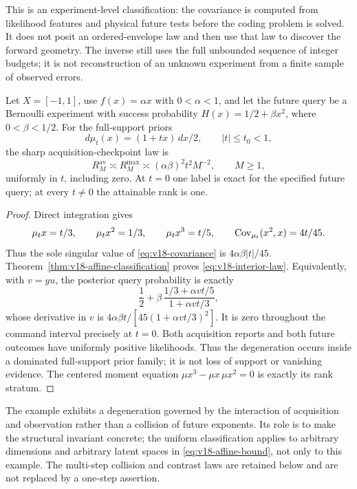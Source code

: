 This is an experiment-level classification: the covariance is computed
from likelihood features and physical future tests before the coding
problem is solved. It does not posit an ordered-envelope law and then
use that law to discover the forward geometry. The inverse still uses
the full unbounded sequence of integer budgets; it is not reconstruction
of an unknown experiment from a finite sample of observed errors.

\begin{proposition}
\label{prop:v18-interior-example}
Let $X=[-1,1]$, use $f(x)=\alpha x$ with $0<\alpha<1$, and let the
future query be a Bernoulli experiment with success probability
$H(x)=1/2+\beta x^2$, where $0<\beta<1/2$. For the full-support priors
\[
 d\mu_t(x)=(1+tx)\,dx/2,\qquad |t|\le t_0<1,
\]
the sharp acquisition-checkpoint law is
\begin{equation}\label{eq:v18-interior-law}
 R^{\mathrm{av}}_M\asymp R^{\mathrm{max}}_M
 \asymp (\alpha\beta)^2t^2M^{-2},\qquad M\ge1,
\end{equation}
uniformly in $t$, including zero. At $t=0$ one label is exact for the
specified future query; at every $t\ne0$ the attainable rank is one.
\end{proposition}
\begin{proof}
Direct integration gives
\[
 \mu_tx=t/3,\qquad \mu_tx^2=1/3,\qquad \mu_tx^3=t/5,
 \qquad \operatorname{Cov}_{\mu_t}(x^2,x)=4t/45.
\]
Thus the sole singular value of \eqref{eq:v18-covariance} is
$4\alpha\beta|t|/45$. Theorem~\ref{thm:v18-affine-classification}
proves \eqref{eq:v18-interior-law}. Equivalently, with $v=yu$, the
posterior query probability is exactly
\[
 \frac12+\beta\,
 \frac{1/3+\alpha vt/5}{1+\alpha vt/3},
\]
whose derivative in $v$ is
$4\alpha\beta t/[45(1+\alpha vt/3)^2]$.
It is zero throughout the command interval precisely at $t=0$.
Both acquisition reports and both future outcomes have uniformly
positive likelihoods. Thus the degeneration occurs inside a dominated
full-support prior family; it is not loss of support or vanishing
evidence. The centered moment equation $\mu x^3-\mu x\,\mu x^2=0$
is exactly its rank stratum.
\end{proof}

The example exhibits a degeneration governed by the interaction of
acquisition and observation rather than a collision of future exponents.
Its role is to make the structural invariant concrete; the uniform
classification applies to arbitrary dimensions and arbitrary latent
spaces in \eqref{eq:v18-affine-bound}, not only to this example. The
multi-step collision and contrast laws are retained below and are not
replaced by a one-step assertion.

